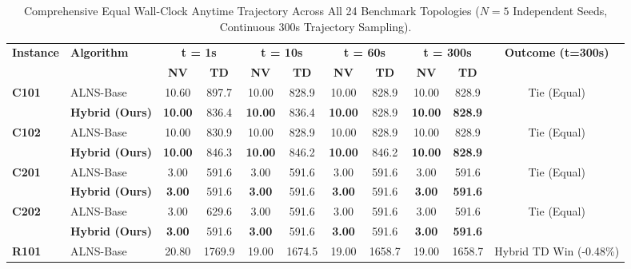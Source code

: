 \begin{table}[!htbp]
\caption{Comprehensive Equal Wall-Clock Anytime Trajectory Across All 24 Benchmark Topologies ($N=5$ Independent Seeds, Continuous 300s Trajectory Sampling).}
\label{tab:supp_anytime_full_24}
\centering
\scriptsize
\setlength{\tabcolsep}{3.5pt}
\begin{tabular*}{\textwidth}{@{\extracolsep{\fill}} ll cccccc cc c @{}}
\toprule
\multirow{2}{*}{\textbf{Instance}} & \multirow{2}{*}{\textbf{Algorithm}} & \multicolumn{2}{c}{\textbf{t = 1s}} & \multicolumn{2}{c}{\textbf{t = 10s}} & \multicolumn{2}{c}{\textbf{t = 60s}} & \multicolumn{2}{c}{\textbf{t = 300s}} & \multirow{2}{*}{\textbf{Outcome (t=300s)}} \\
\cmidrule(lr){3-4} \cmidrule(lr){5-6} \cmidrule(lr){7-8} \cmidrule(lr){9-10}
 & & \textbf{NV} & \textbf{TD} & \textbf{NV} & \textbf{TD} & \textbf{NV} & \textbf{TD} & \textbf{NV} & \textbf{TD} & \\
\midrule
\multirow{2}{*}{\textbf{C101}} & ALNS-Base & 10.60 & 897.7 & 10.00 & 828.9 & 10.00 & 828.9 & 10.00 & 828.9 & \multirow{2}{*}{Tie (Equal)} \\
 & \textbf{Hybrid (Ours)} & \textbf{10.00} & 836.4 & \textbf{10.00} & 836.4 & \textbf{10.00} & 828.9 & \textbf{10.00} & \textbf{828.9} & \\
\midrule
\multirow{2}{*}{\textbf{C102}} & ALNS-Base & 10.00 & 830.9 & 10.00 & 828.9 & 10.00 & 828.9 & 10.00 & 828.9 & \multirow{2}{*}{Tie (Equal)} \\
 & \textbf{Hybrid (Ours)} & \textbf{10.00} & 846.3 & \textbf{10.00} & 846.2 & \textbf{10.00} & 846.2 & \textbf{10.00} & \textbf{828.9} & \\
\midrule
\multirow{2}{*}{\textbf{C201}} & ALNS-Base & 3.00 & 591.6 & 3.00 & 591.6 & 3.00 & 591.6 & 3.00 & 591.6 & \multirow{2}{*}{Tie (Equal)} \\
 & \textbf{Hybrid (Ours)} & \textbf{3.00} & 591.6 & \textbf{3.00} & 591.6 & \textbf{3.00} & 591.6 & \textbf{3.00} & \textbf{591.6} & \\
\midrule
\multirow{2}{*}{\textbf{C202}} & ALNS-Base & 3.00 & 629.6 & 3.00 & 591.6 & 3.00 & 591.6 & 3.00 & 591.6 & \multirow{2}{*}{Tie (Equal)} \\
 & \textbf{Hybrid (Ours)} & \textbf{3.00} & 591.6 & \textbf{3.00} & 591.6 & \textbf{3.00} & 591.6 & \textbf{3.00} & \textbf{591.6} & \\
\midrule
\multirow{2}{*}{\textbf{R101}} & ALNS-Base & 20.80 & 1769.9 & 19.00 & 1674.5 & 19.00 & 1658.7 & 19.00 & 1658.7 & \multirow{2}{*}{Hybrid TD Win (-0.48\%)} \\

\end{tabular*}
\end{table}
